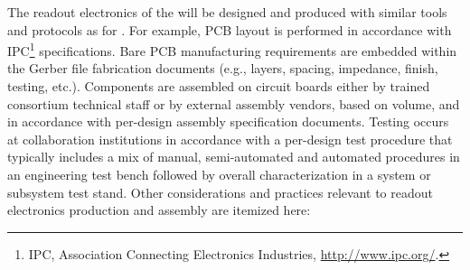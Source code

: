 The readout electronics of the  will be designed and produced with similar tools and protocols as for  . For example, %
PCB layout is performed in accordance with IPC\footnote{IPC\texttrademark{}, Association Connecting Electronics Industries, \url{http://www.ipc.org/}.} specifications. Bare PCB manufacturing requirements are embedded within the Gerber file 
fabrication documents (e.g., layers, spacing, impedance, finish, testing, etc.). Components are assembled on circuit boards either by trained  consortium technical staff or by external assembly vendors, based on volume, and in accordance with per-design assembly specification documents. Testing occurs at %
collaboration institutions in accordance with a per-design test procedure that typically includes a mix of manual, semi-automated and automated procedures %
in an engineering test bench followed by overall characterization in a system or subsystem test stand.
Other considerations and practices relevant to readout electronics production and assembly are itemized here:

